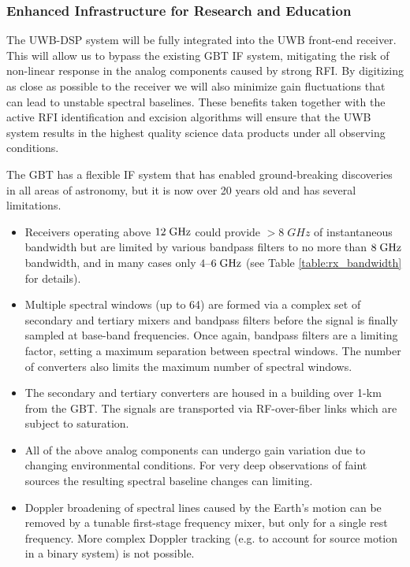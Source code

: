 \documentclass[10pt]{myNSF}
\begin{document}
\subsubsection{Enhanced Infrastructure for Research and Education}
\label{sec:infrastructure}


The UWB-DSP system will be fully integrated into the UWB front-end
receiver.  This will allow us to bypass the existing GBT IF system,
mitigating the risk of non-linear response in the analog components
caused by strong RFI.  By digitizing as close as possible to the
receiver we will also minimize gain fluctuations that can lead to
unstable spectral baselines.  These benefits taken together with the
active RFI identification and excision algorithms will ensure that the
UWB system results in the highest quality science data products under
all observing conditions.


The GBT has a flexible IF system that has enabled ground-breaking
discoveries in all areas of astronomy, but it is now over 20 years old
and has several limitations.
\begin{itemize}
  \item{Receivers operating above $12\; \textrm{GHz}$ could provide $>8\; GHz$
    of instantaneous bandwidth but are limited by various bandpass
    filters to no more than $8\; \textrm{GHz}$ bandwidth, and in many cases
    only $4$--$6\; \textrm{GHz}$ (see Table \ref{table:rx_bandwidth} for
    details).}
  \item{Multiple spectral windows (up to 64) are formed via a complex
    set of secondary and tertiary mixers and bandpass filters before
    the signal is finally sampled at base-band frequencies.  Once
    again, bandpass filters are a limiting factor, setting a maximum
    separation between spectral windows.  The number of converters
    also limits the maximum number of spectral windows.}
  \item{The secondary and tertiary converters are housed in a building
    over 1-km from the GBT.  The signals are transported via
    RF-over-fiber links which are subject to saturation.}
  \item{All of the above analog components can undergo gain variation
    due to changing environmental conditions.  For very deep
    observations of faint sources the resulting spectral baseline
    changes can limiting.}
  \item{Doppler broadening of spectral lines caused by the Earth's
    motion can be removed by a tunable first-stage frequency mixer,
    but only for a single rest frequency.  More complex Doppler
    tracking (e.g. to account for source motion in a binary system) is
    not possible.}
\end{itemize}
\end{document}
